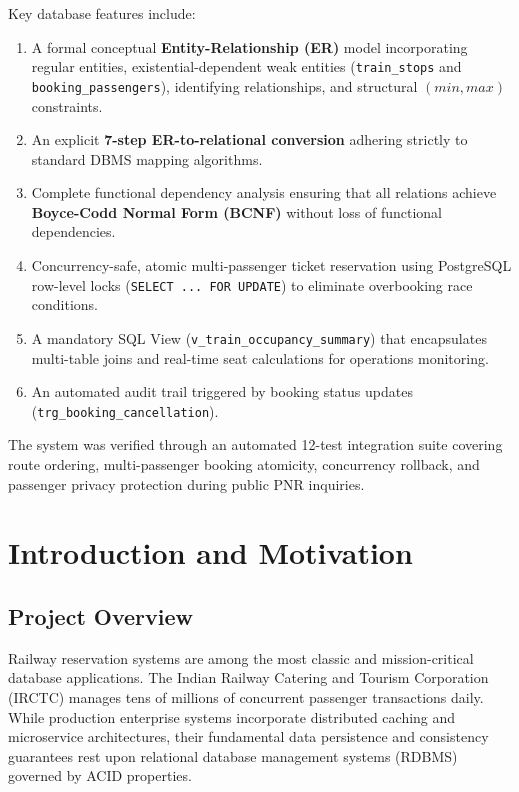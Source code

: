 \documentclass[12pt,a4paper]{report}
\begin{document}
Key database features include:
\begin{enumerate}[label=(\roman*)]
    \item A formal conceptual \textbf{Entity-Relationship (ER)} model incorporating regular entities, existential-dependent weak entities (\texttt{train\_stops} and \texttt{booking\_passengers}), identifying relationships, and structural $(min, max)$ constraints.
    \item An explicit \textbf{7-step ER-to-relational conversion} adhering strictly to standard DBMS mapping algorithms.
    \item Complete functional dependency analysis ensuring that all relations achieve \textbf{Boyce-Codd Normal Form (BCNF)} without loss of functional dependencies.
    \item Concurrency-safe, atomic multi-passenger ticket reservation using PostgreSQL row-level locks (\texttt{SELECT ... FOR UPDATE}) to eliminate overbooking race conditions.
    \item A mandatory SQL View (\texttt{v\_train\_occupancy\_summary}) that encapsulates multi-table joins and real-time seat calculations for operations monitoring.
    \item An automated audit trail triggered by booking status updates (\texttt{trg\_booking\_cancellation}).
\end{enumerate}
The system was verified through an automated 12-test integration suite covering route ordering, multi-passenger booking atomicity, concurrency rollback, and passenger privacy protection during public PNR inquiries.

\newpage
\tableofcontents
\newpage
\listoffigures
\newpage
\listoftables

\newpage
{}

\chapter{Introduction and Motivation}

\section{Project Overview}
Railway reservation systems are among the most classic and mission-critical database applications. The Indian Railway Catering and Tourism Corporation (IRCTC) manages tens of millions of concurrent passenger transactions daily. While production enterprise systems incorporate distributed caching and microservice architectures, their fundamental data persistence and consistency guarantees rest upon relational database management systems (RDBMS) governed by ACID properties.
\end{document}
